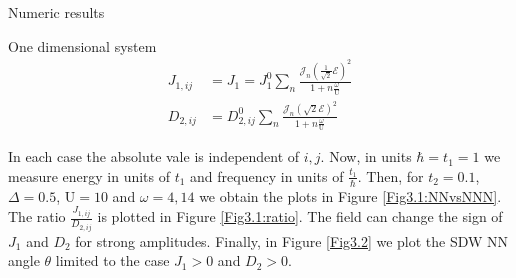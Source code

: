 \begin{section}{Numeric results}
\begin{subsection}{One dimensional system}
\begin{align}
J_{1,ij} &= J_{1} = J_{1}^0  \sum_{n} \frac{\mathcal{J}_n(\frac{1}{\sqrt{2}}\mathcal{E})^2}{1+n\frac{\omega}{\text{U}}} \\
D_{2,ij} &= D_{2,ij}^0  \sum_{n} \frac{\mathcal{J}_n(\sqrt{2}\mathcal{E})^2}{1+n\frac{\omega}{\text{U}}}
\end{align}

In each case the absolute vale is independent of $i,j$.  Now, in units $\hbar=t_1=1$ we measure energy in units of $t_1$ and frequency in units of $\frac{t_1}{\hbar}$. Then, for $t_2 = 0.1$, $\Delta = 0.5$, $\text{U} = 10$ and $\omega = 4, 14$ we obtain the plots in Figure \ref{Fig3.1:NNvsNNN}. The ratio $\frac{J_{1,ij}}{D_{2,ij}}$ is plotted in Figure \ref{Fig3.1:ratio}. The field can change the sign of $J_1$ and $D_2$ for strong amplitudes. Finally, in Figure \ref{Fig3.2} we plot the SDW NN angle $\theta$ limited to the case $J_1 > 0$ and $D_2 > 0$.


\end{subsection}
\end{section}
